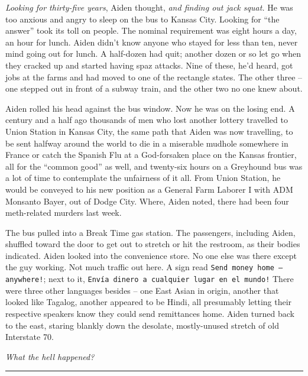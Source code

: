 \documentclass[11pt]{book}
\begin{document}
	\textit{Looking for thirty-five years}, Aiden thought, \textit{and finding out jack squat.} He was too anxious and angry to sleep on the bus to Kansas City. Looking for ``the answer'' took its toll on people. The nominal requirement was eight hours a day, an hour for lunch. Aiden didn't know anyone who stayed for less than ten, never mind going out for lunch. A half-dozen had quit; another dozen or so let go when they cracked up and started having spaz attacks. Nine of these, he'd heard, got jobs at the farms and had moved to one of the rectangle states. The other three -- one stepped out in front of a subway train, and the other two no one knew about.

	Aiden rolled his head against the bus window. Now he was on the losing end. A century and a half ago thousands of men who lost another lottery travelled to Union Station in Kansas City, the same path that Aiden was now travelling, to be sent halfway around the world to die in a miserable mudhole somewhere in France or catch the Spanish Flu at a God-forsaken place on the Kansas frontier, all for the ``common good'' as well, and twenty-six hours on a Greyhound bus was a lot of time to contemplate the unfairness of it all. From Union Station, he would be conveyed to his new position as a General Farm Laborer I with ADM Monsanto Bayer, out of Dodge City. Where, Aiden noted, there had been four meth-related murders last week.
	
	The bus pulled into a Break Time gas station. The passengers, including Aiden, shuffled toward the door to get out to stretch or hit the restroom, as their bodies indicated. Aiden looked into the convenience store. No one else was there except the guy working. Not much traffic out here. A sign read \texttt{Send money home -- anywhere!}; next to it, \texttt{\textexclamdown Envía dinero a cualquier lugar en el mundo!} There were three other languages besides -- one East Asian in origin, another that looked like Tagalog, another appeared to be Hindi, all presumably letting their respective speakers know they could send remittances home. Aiden turned back to the east, staring blankly down the desolate, mostly-unused stretch of old Interstate 70.
	
	\textit{What the hell happened?}
	
	\vspace{0.5cm}
	\hrule
	\vspace{0.5cm}
	
\end{document}
